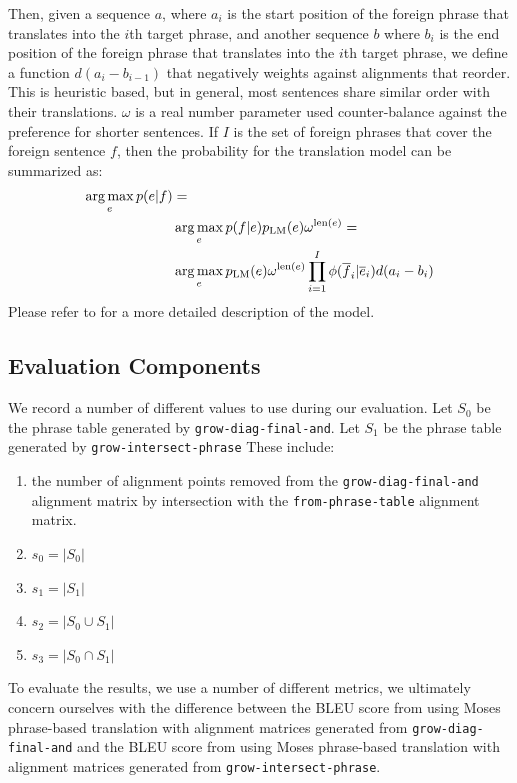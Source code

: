 \documentclass[twocolumn]{article}
\newcommand{\linespacing}{
  \onehalfspacing
}
\newcommand{\originalAlign}{\texttt{grow-diag-final-and}}
\newcommand{\phraseAlign}{\texttt{from-phrase-table}}
\newcommand{\phraseIntersectAlign}{\texttt{grow-intersect-phrase}}
\newcommand{\wrapSingleSpacing}[1]{
  \singlespacing
  #1
  \linespacing{}
}
\begin{document}
Then, given a sequence $a$, where $a_i$ is the start position of the foreign
phrase that translates into the $i$th target phrase,
and another sequence $b$ where $b_i$ is the end position of the foreign phrase
that translates into the $i$th target phrase,
we define a function $d(a_i - b_{i-1})$ that negatively weights against
alignments that reorder. This is heuristic based, but in general, most sentences
share similar order with their translations. $\omega$ is a real number
parameter used counter-balance against the preference for shorter sentences.
If $I$ is the set of foreign phrases that cover the foreign sentence $f$, then
the probability for the translation model can be summarized as:
\begin{align*}
  \operatorname*{arg\,max}_e p(e|f) & = \\
      & \operatorname*{arg\,max}_e p(f|e) p_{\text{LM}}(e) \omega^{\text{len}(e)} = \\
      & \operatorname*{arg\,max}_e p_{\text{LM}}(e) \omega^{\text{len}(e)}
                  \prod_{i=1}^I \phi(\overline{f}_i | \overline{e}_i)
                              d(a_i - b_{i})
\end{align*}
Please refer to \cite{kom2003} for a more detailed description of the model.


\subsection{Evaluation Components}
We record a number of different values to use during our evaluation.
Let $S_0$ be the phrase table generated by \originalAlign{}.
Let $S_1$ be the phrase table generated by \phraseIntersectAlign{}
These include:
\wrapSingleSpacing{
\begin{enumerate}
  \item the number of alignment points removed from
    the \originalAlign{} alignment matrix
    by intersection with
    the \phraseAlign{} alignment matrix.
  \item $s_0 = |S_0|$
  \item $s_1 = |S_1|$
  \item $s_2 = |S_0 \cup S_1|$
  \item $s_3 = |S_0 \cap S_1|$
\end{enumerate}
}

To evaluate the results, we use a number of different metrics, we ultimately
concern ourselves with the difference between the BLEU score from using Moses
phrase-based translation with alignment matrices generated from \originalAlign{}
and the BLEU score from using Moses phrase-based translation with alignment
matrices generated from \phraseIntersectAlign{}.
\end{document}
